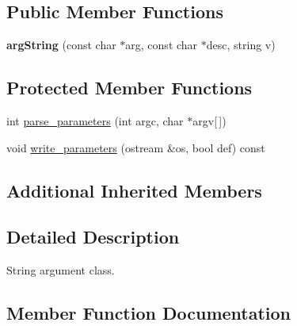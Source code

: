 \subsection*{Public Member Functions}
\begin{DoxyCompactItemize}
\item 
{\bfseries arg\+String} (const char $\ast$arg, const char $\ast$desc, string v)\hypertarget{classclarg_1_1arg_string_a8b6bad644226b839a2ec02c6c8c03eec}{}\label{classclarg_1_1arg_string_a8b6bad644226b839a2ec02c6c8c03eec}

\end{DoxyCompactItemize}
\subsection*{Protected Member Functions}
\begin{DoxyCompactItemize}
\item 
int \hyperlink{classclarg_1_1arg_string_a06a724f38fc4df3732d9ab2072705c6c}{parse\+\_\+parameters} (int argc, char $\ast$argv\mbox{[}$\,$\mbox{]})
\item 
void \hyperlink{classclarg_1_1arg_string_ae336afebabd08c78b5323e1c6eba8ba7}{write\+\_\+parameters} (ostream \&os, bool def) const 
\end{DoxyCompactItemize}
\subsection*{Additional Inherited Members}


\subsection{Detailed Description}
String argument class. 

\subsection{Member Function Documentation}

